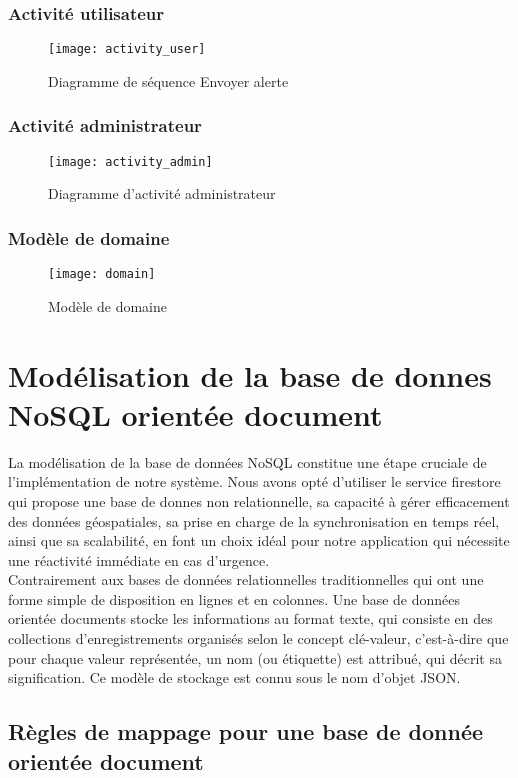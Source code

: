 \subsubsection{Activité utilisateur}
\begin{figure}[H]
	\texttt{[image: activity\_user]}
	\caption{Diagramme de séquence Envoyer alerte}
\end{figure}

\subsubsection{Activité administrateur}
\begin{figure}[H]
	\texttt{[image: activity\_admin]}
	\caption{Diagramme d’activité administrateur}
\end{figure}

\subsubsection{Modèle de domaine}
\begin{figure}[H]
	\texttt{[image: domain]}
	\caption{Modèle de domaine}
\end{figure}

\section{Modélisation de la base de donnes NoSQL orientée document}
La modélisation de la base de données NoSQL constitue une étape cruciale de l'implémentation de notre système. Nous avons opté d’utiliser le service firestore qui propose une base de donnes non relationnelle, sa capacité à gérer efficacement des données géospatiales, sa prise en charge de la synchronisation en temps réel, ainsi que sa scalabilité, en font un choix idéal pour notre application qui nécessite une réactivité immédiate en cas d'urgence.\\

Contrairement aux bases de données relationnelles traditionnelles qui ont une forme simple de disposition en lignes et en colonnes. Une base de données orientée documents stocke les informations au format texte, qui consiste en des collections d'enregistrements organisés selon le concept clé-valeur, c'est-à-dire que pour chaque valeur représentée, un nom (ou étiquette) est attribué, qui décrit sa signification. Ce  modèle de stockage est connu sous le nom d'objet JSON.

\subsection{Règles de mappage pour une base de donnée orientée document}

